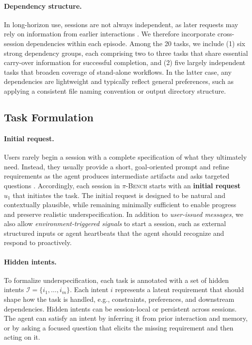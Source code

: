 \documentclass{llmxive}
\providecommand{\bench}{\textsc{$\pi$-Bench}}
\begin{document}
\paragraph{Dependency structure.}
In long-horizon use, sessions are not always independent, as later requests may rely on information from earlier interactions \citep{he2026memoryarena}. We therefore incorporate cross-session dependencies within each episode. Among the 20 tasks, we include (1) six strong dependency groups, each comprising two to three tasks that share essential carry-over information for successful completion, and (2) five largely independent tasks that broaden coverage of stand-alone workflows. In the latter case, any dependencies are lightweight and typically reflect general preferences, such as applying a consistent file naming convention or output directory structure.

\subsection{Task Formulation}
\label{sec:task_formulation}

\paragraph{Initial request.}
Users rarely begin a session with a complete specification of what they ultimately need. Instead, they usually provide a short, goal-oriented prompt and refine requirements as the agent produces intermediate artifacts and asks targeted questions \citep{vijayvargiya2026asking,chen2024learning,kaur2026proper}. Accordingly, each session in {\bench} starts with an \textbf{initial request} $u_1$ that initiates the task.
The initial request is designed to be natural and contextually plausible, while remaining minimally sufficient to enable progress and preserve realistic underspecification. In addition to \textit{user-issued messages}, we also allow \textit{environment-triggered signals} to start a session, such as external structured inputs or agent heartbeats \citep{nanobot} that the agent should recognize and respond to proactively.

\paragraph{Hidden intents.}
To formalize underspecification, each task is annotated with a set of {hidden intents} $\mathcal{I}=\{i_1,\dots,i_m\}$.
Each intent $i$ represents a latent requirement that should shape how the task is handled, e.g., constraints, preferences, and downstream dependencies. Hidden intents can be session-local or persistent across sessions. The agent can satisfy an intent by inferring it from prior interaction and memory, or by asking a focused question that elicits the missing requirement and then acting on it.
\end{document}
